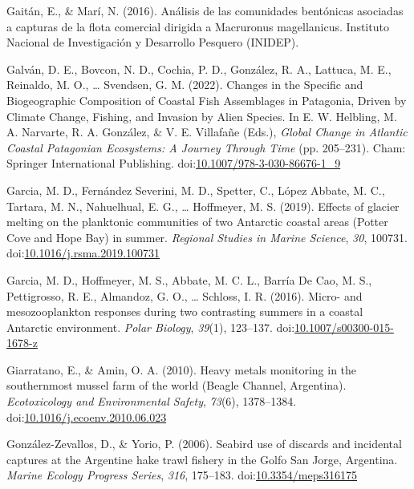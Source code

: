\documentclass[
]{article}
\newlength{\cslhangindent}
\newenvironment{CSLReferences}[2] %
 {\begin{list}{}{%
  \setlength{\itemindent}{0pt}
  \setlength{\leftmargin}{0pt}
  \setlength{\parsep}{0pt}
  \ifodd #1
   \setlength{\leftmargin}{\cslhangindent}
   \setlength{\itemindent}{-1\cslhangindent}
  \fi
  \setlength{\itemsep}{#2\baselineskip}}}
 {\end{list}}
\begin{document}
\begin{CSLReferences}{1}{0}
Gaitán, E., \& Marí, N. (2016). {Análisis de las comunidades bentónicas
asociadas a capturas de la flota comercial dirigida a Macruronus
magellanicus}. {Instituto Nacional de Investigación y Desarrollo
Pesquero (INIDEP)}.

Galván, D. E., Bovcon, N. D., Cochia, P. D., González, R. A., Lattuca,
M. E., Reinaldo, M. O., \ldots{} Svendsen, G. M. (2022). Changes in the
{Specific} and {Biogeographic Composition} of {Coastal Fish Assemblages}
in {Patagonia}, {Driven} by {Climate Change}, {Fishing}, and {Invasion}
by {Alien Species}. In E. W. Helbling, M. A. Narvarte, R. A. González,
\& V. E. Villafañe (Eds.), \emph{Global {Change} in {Atlantic Coastal
Patagonian Ecosystems}: {A Journey Through Time}} (pp. 205--231).
{Cham}: {Springer International Publishing}.
doi:\href{https://doi.org/10.1007/978-3-030-86676-1_9}{10.1007/978-3-030-86676-1\_9}

Garcia, M. D., Fernández Severini, M. D., Spetter, C., López Abbate, M.
C., Tartara, M. N., Nahuelhual, E. G., \ldots{} Hoffmeyer, M. S. (2019).
Effects of glacier melting on the planktonic communities of two
{Antarctic} coastal areas ({Potter Cove} and {Hope Bay}) in summer.
\emph{Regional Studies in Marine Science}, \emph{30}, 100731.
doi:\href{https://doi.org/10.1016/j.rsma.2019.100731}{10.1016/j.rsma.2019.100731}

Garcia, M. D., Hoffmeyer, M. S., Abbate, M. C. L., Barría De Cao, M. S.,
Pettigrosso, R. E., Almandoz, G. O., \ldots{} Schloss, I. R. (2016).
Micro- and mesozooplankton responses during two contrasting summers in a
coastal {Antarctic} environment. \emph{Polar Biology}, \emph{39}(1),
123--137.
doi:\href{https://doi.org/10.1007/s00300-015-1678-z}{10.1007/s00300-015-1678-z}

Giarratano, E., \& Amin, O. A. (2010). Heavy metals monitoring in the
southernmost mussel farm of the world ({Beagle Channel}, {Argentina}).
\emph{Ecotoxicology and Environmental Safety}, \emph{73}(6), 1378--1384.
doi:\href{https://doi.org/10.1016/j.ecoenv.2010.06.023}{10.1016/j.ecoenv.2010.06.023}

González-Zevallos, D., \& Yorio, P. (2006). Seabird use of discards and
incidental captures at the {Argentine} hake trawl fishery in the {Golfo
San Jorge}, {Argentina}. \emph{Marine Ecology Progress Series},
\emph{316}, 175--183.
doi:\href{https://doi.org/10.3354/meps316175}{10.3354/meps316175}


\end{CSLReferences}
\end{document}
